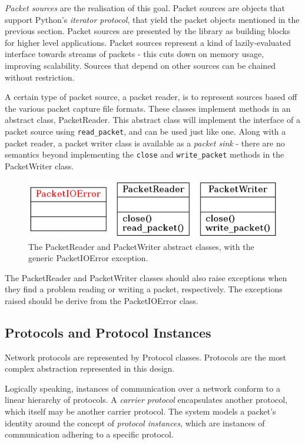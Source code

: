 \documentclass[10pt,a4paper,notitlepage]{report}
\begin{document}
\emph{Packet sources} are the realisation of this goal. Packet sources are objects that support Python's \emph{iterator protocol}, that yield the packet objects mentioned in the previous section. Packet sources are presented by the library as building blocks for higher level applications.
Packet sources represent a kind of lazily-evaluated interface towards streams of packets - this cuts down on memory usage, improving scalability. Sources that depend on other sources can be chained without restriction.

A certain type of packet source, a packet reader, is to represent sources based off the various packet capture file formats. These classes implement methods in an abstract class, PacketReader. This abstract class will implement the interface of a packet source using \texttt{read_packet}, and can be used just like one. Along with a packet reader, a packet writer class is available as a \emph{packet sink} - there are no semantics beyond implementing the \texttt{close} and \texttt{write_packet} methods in the PacketWriter class.

\begin{figure}[H]
\center
\includegraphics[scale=0.7]{diagrams/packetio.png}
\caption{The PacketReader and PacketWriter abstract classes, with the generic PacketIOError exception.}
\end{figure}

The PacketReader and PacketWriter classes should also raise exceptions when they find a problem reading or writing a packet, respectively. The exceptions raised should be derive from the PacketIOError class.

\subsection{Protocols and Protocol Instances}
\label{sec:desproto}
Network protocols are represented by Protocol classes. Protocols are the most complex abstraction represented in this design.

Logically speaking, instances of communication over a network conform to a linear hierarchy of protocols. A \emph{carrier protocol} encapsulates another protocol, which itself may be another carrier protocol. The system models a packet's identity around the concept of \emph{protocol instances}, which are instances of communication adhering to a specific protocol.
\end{document}
